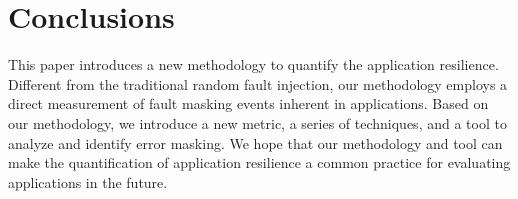 \section{Conclusions}
\label{sec:conclusions}
\begin{spacing}{0.9}
This paper introduces a new methodology to quantify the application resilience.
Different from the traditional random fault injection, 
our methodology employs a direct measurement of fault masking events inherent in applications. 
Based on our methodology, we introduce a new metric, a series of techniques, and a tool to analyze and identify error masking.
We hope that our methodology and tool can make the quantification of application resilience a common practice for evaluating applications in the future. 
\end{spacing}

\begin{comment}
Based on our methodology, we introduce a new metric, a series of techniques, and 
a tool to analyze and identify error masking.  
We apply our model to study fault tolerance of various scientific applications, and demonstrate
tangible benefits of using a model-driven approach to direct fault tolerance mechanisms
for large-scale high performance computing systems.
We hope that our methodology and tool can make the quantification of application resilience
a common practice for evaluating applications in the future. 
\end{comment}

